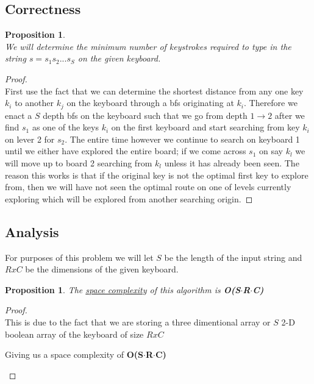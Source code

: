 \documentclass[12pt]{article}
\newtheorem{proposition}[theorem]{Proposition}
\begin{document}

\subsection{Correctness}
\begin{proposition}
~ \\ \indent We will determine the minimum number of keystrokes required to type in the string $s = s_1 s_2 ... s_S$
on the given keyboard.
\end{proposition}

\begin{proof}
~ \\ \indent First use the fact that we can determine the shortest distance from any one key $k_i$ to another $k_j$
on the keyboard through a bfs originating at $k_i$. Therefore we enact a $S$ depth bfs on the keyboard such that
we go from depth $1 \rightarrow 2$ after we find $s_1$ as one of the keys $k_i$ on the first keyboard and start
searching from key $k_i$ on lever 2 for $s_2$. The entire time however we continue to search on keyboard 1 until
we either have explored the entire board; if we come across $s_1$ on say $k_l$ we will move up to board 2
searching from $k_l$ unless it has already been seen. The reason this works is that if the original key is not the
optimal first key to explore from, then we will have not seen the optimal route on one of levels currently exploring
which will be explored from another searching origin.
\end{proof}


\subsection{Analysis}
For purposes of this problem we will let $S$ be the length of the input string and $RxC$ be the dimensions of the
given keyboard.
\begin{proposition}
\label{numq}
The \underline{space complexity} of this algorithm is \textbf{O(S$\cdot$R$\cdot$C)}
\end{proposition}

\begin{proof}
~ \\ \indent This is due to the fact that we are storing a three dimentional array or $S$ 2-D boolean array of the
keyboard of size $RxC$
\begin{center}
    Giving us a space complexity of \textbf{O(S$\cdot$R$\cdot$C)}
\end{center}
\end{proof}
\end{document}
